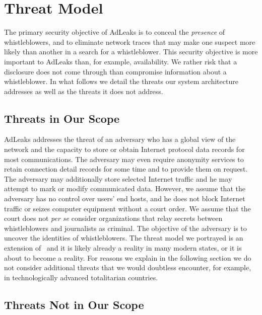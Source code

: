 \documentclass[twocolumn,10pt]{article}
\begin{document}
\section{Threat Model}

The primary security objective of AdLeaks is to conceal the \emph{presence}
of whistleblowers, and to eliminate network traces that may make one suspect
more likely than another in a search for a whistleblower.  This security
objective is more important to AdLeaks than, for example, availability.  We
rather risk that a disclosure does not come through than compromise
information about a whistleblower.  In what follows we detail the threats
our system architecture addresses as well as the threats it does not
address.

\subsection{Threats in Our Scope}

AdLeaks addresses the threat of an adversary who has a global view of the
network and the capacity to store or obtain Internet protocol data records
for most communications.  The adversary may even require anonymity services
to retain connection detail records for some time and to provide them on
request.  The adversary may additionally store selected Internet traffic and
he may attempt to mark or modify communicated data.  However, we assume that
the adversary has no control over users' end hosts, and he does not block
Internet traffic or seizes computer equipment without a court order.  We
assume that the court does not \emph{per se} consider organizations that
relay secrets between whistleblowers and journalists as criminal.  The
objective of the adversary is to uncover the identities of whistleblowers.
The threat model we portrayed is an extension of~\cite{BertholdBK2009} and
it is likely already a reality in many modern states, or it is about to
become a reality.  For reasons we explain in the following section we do not
consider additional threats that we would doubtless encounter, for example,
in technologically advanced totalitarian countries.

\subsection{Threats Not in Our Scope}
\end{document}
